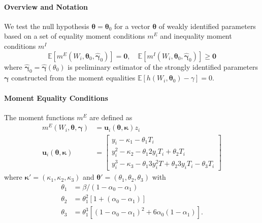\documentclass[12pt]{article}
\begin{document}
\paragraph{Overview and Notation}
We test the null hypothesis $\boldsymbol{\theta} = \boldsymbol{\theta}_0$ for a vector $\boldsymbol{\theta}$ of weakly identified parameters based on a set of equality moment conditions $m^E$ and inequality moment conditions $m^I$
\[
  \mathbb{E}\left[ m^E\left(W_i, \boldsymbol{\theta}_0, \widehat{\boldsymbol{\gamma}}_0\right) \right] = \mathbf{0}, \quad \mathbb{E}\left[ m^I(W_i, \boldsymbol{\theta}_0, \widehat{\boldsymbol{\gamma}}_0) \right] \geq \mathbf{0}
\]
where $\widehat{\boldsymbol{\gamma}}_0 = \widehat{\boldsymbol{\gamma}}(\theta_0)$ is preliminary estimator of the strongly identified parameters $\boldsymbol{\gamma}$ constructed from the moment equalities $\mathbb{E}\left[ h(W_i, \boldsymbol{\theta}_0) - \gamma \right]=0$.

\paragraph{Moment Equality Conditions}
The moment functions $m^E$ are defined as 
\begin{align*}
  m^E(W_i, \boldsymbol{\theta}, \boldsymbol{\gamma}) &=  \mathbf{u}_i(\boldsymbol{\theta}, \boldsymbol{\kappa}) z_i\\
  \mathbf{u}_i(\boldsymbol{\theta}, \boldsymbol{\kappa}) &= 
  \left[
  \begin{array}{l}
 y_i - \kappa_1 - \theta_1 T_i\\
 y^2_i - \kappa_2 - \theta_1 2 y_i T_i + \theta_2 T_i\\
 y^3_i - \kappa_3 - \theta_1 3y_i^2 T + \theta_2 3y_iT_i - \theta_3 T_i
  \end{array}
\right]
\end{align*}
where $\boldsymbol{\kappa}' = (\kappa_1, \kappa_2, \kappa_3)$ and  $\boldsymbol{\theta}' = (\theta_1, \theta_2, \theta_3)$ with
\begin{align*}
  \theta_1 &= \beta/(1 - \alpha_0 - \alpha_1)\\
  \theta_2 &= \theta_1^2 \left[ 1 + (\alpha_0 - \alpha_1) \right]\\
  \theta_3 &= \theta_1^3\left[ \left( 1 - \alpha_0 - \alpha_1 \right)^2 + 6\alpha_0\left( 1 - \alpha_1 \right) \right].
\end{align*}
\end{document}
